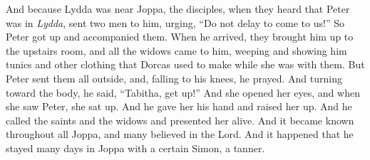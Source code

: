 \begin{biblechapter}
\verse And because Lydda was near Joppa, the disciples, when they heard that Peter was in \textit{Lydda}, sent two men to him, urging, “Do not delay to come to us!”
\verse So Peter got up and accompanied them. When he arrived, they brought him up to the upstairs room, and all the widows came to him, weeping and showing him tunics and other clothing that Dorcas used to make while she was with them.
\verse But Peter sent them all outside, and, falling to his knees, he prayed. And turning toward the body, he said, “Tabitha, get up!” And she opened her eyes, and when she saw Peter, she sat up.
\verse And he gave her his hand and raised her up. And he called the saints and the widows and presented her alive.
\verse And it became known throughout all Joppa, and many believed in the Lord.
\verse And it happened that he stayed many days in Joppa with a certain Simon, a tanner.
\end{biblechapter}


